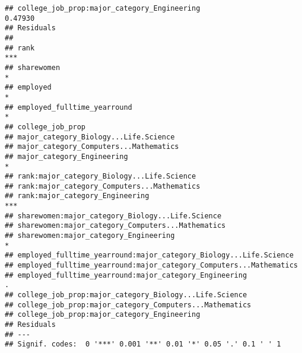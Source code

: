 \documentclass[
]{article}
\begin{document}
\begin{verbatim}
## college_job_prop:major_category_Engineering                          0.47930
## Residuals                                                                   
##                                                                       
## rank                                                               ***
## sharewomen                                                         *  
## employed                                                           *  
## employed_fulltime_yearround                                        *  
## college_job_prop                                                      
## major_category_Biology...Life.Science                                 
## major_category_Computers...Mathematics                                
## major_category_Engineering                                         *  
## rank:major_category_Biology...Life.Science                            
## rank:major_category_Computers...Mathematics                           
## rank:major_category_Engineering                                    ***
## sharewomen:major_category_Biology...Life.Science                      
## sharewomen:major_category_Computers...Mathematics                     
## sharewomen:major_category_Engineering                              *  
## employed_fulltime_yearround:major_category_Biology...Life.Science     
## employed_fulltime_yearround:major_category_Computers...Mathematics    
## employed_fulltime_yearround:major_category_Engineering             .  
## college_job_prop:major_category_Biology...Life.Science                
## college_job_prop:major_category_Computers...Mathematics               
## college_job_prop:major_category_Engineering                           
## Residuals                                                             
## ---
## Signif. codes:  0 '***' 0.001 '**' 0.01 '*' 0.05 '.' 0.1 ' ' 1
\end{verbatim}
\end{document}

